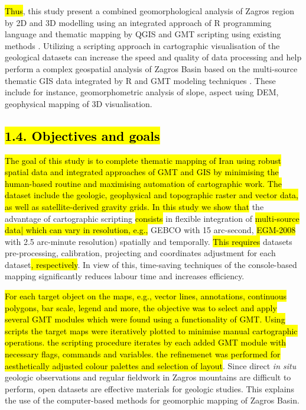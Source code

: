 \documentclass[12pt,a4paper,oneside]{article}
\def \newpar{\vspace{6pt}}
\begin{document}
\newpar \hl{Thus}, this study present a combined geomorphological analysis of Zagros region by 2D and 3D modelling using an integrated approach of R programming language and thematic mapping by QGIS and GMT scripting using existing methods \citep{Lemenkova202203}. Utilizing a scripting approach in cartographic visualisation of the geological datasets can increase the speed and quality of data processing and help perform a complex geospatial analysis of Zagros Basin based on the multi-source thematic GIS data integrated by R and GMT modeling techniques \citep{Lemenkova2019a}. These include for instance, geomorphometric analysis of slope, aspect using DEM, geophysical mapping of 3D visualisation. 

\subsection*{\hl{1.4. Objectives and goals}}

\newpar \hl{The goal of this study is to complete thematic mapping of Iran using robust spatial data and integrated approaches of GMT and GIS by minimising the human-based routine and maximising automation of cartographic work. The dataset include the geologic, geophysical and topographic raster and vector data, as well as satellite-derived gravity grids. In this study we show that} the advantage of cartographic scripting \hl{consists} in flexible integration of \hl{multi-source data| which can vary in resolution, e.g., }GEBCO with 15 arc-second, \hl{EGM-2008} with 2.5 arc-minute resolution) spatially and temporally. \hl{This requires} datasets pre-processing, calibration, projecting and coordinates adjustment for each dataset\hl{, respectively}. In view of this, time-saving techniques of the console-based mapping significantly reduces labour time and increases efficiency. 

\newpar \hl{For each target object on the maps, e.g., vector lines, annotations, continuous polygons, bar scale, legend and more, the objective was to select and apply several GMT modules which were found using a functionality of GMT. Using scripts the target maps were iteratively plotted to minimise manual cartographic operations. the scripting procedure iterates by each added GMT module with necessary flags, commands and variables. the refinemenet was performed for aesthetically adjusted colour palettes and selection of layout}. Since\hl{ }direct \emph{in situ} geologic observations and regular fieldwork in Zagros mountains are difficult to perform, open datasets are effective materials for geologic studies. This explains the use of the computer-based methods for geomorphic mapping of Zagros Basin. 
\end{document}
